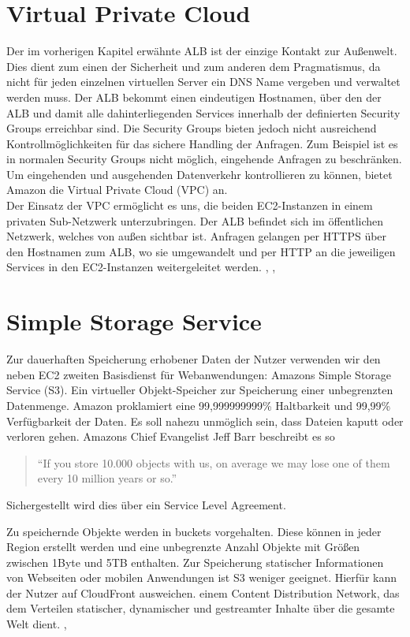 \section{Virtual Private Cloud}
\label{sec:vpc}
Der im vorherigen Kapitel erwähnte ALB ist der einzige Kontakt zur Außenwelt. Dies dient zum einen der Sicherheit und zum anderen dem Pragmatismus, da nicht für jeden einzelnen virtuellen Server ein DNS Name vergeben und verwaltet werden muss. Der ALB bekommt einen eindeutigen Hostnamen, über den der ALB und damit alle dahinterliegenden Services innerhalb der definierten Security Groups erreichbar sind. Die Security Groups bieten jedoch nicht ausreichend Kontrollmöglichkeiten für das sichere Handling der Anfragen. Zum Beispiel ist es in normalen Security Groups nicht möglich, eingehende Anfragen zu beschränken. Um eingehenden und ausgehenden Datenverkehr kontrollieren zu können, bietet Amazon die Virtual Private Cloud (VPC) an. \\
Der Einsatz der VPC ermöglicht es uns, die beiden EC2-Instanzen in einem privaten Sub-Netzwerk unterzubringen. Der ALB befindet sich im öffentlichen Netzwerk, welches von außen sichtbar ist. Anfragen gelangen per HTTPS über den Hostnamen zum ALB, wo sie umgewandelt und per HTTP an die jeweiligen Services in den EC2-Instanzen weitergeleitet werden.
\cite{vliet:resilience}, \cite{wittig:awsinaction}, \cite{aws:vpc}

\section{Simple Storage Service}
\label{sec:s3}
Zur dauerhaften Speicherung erhobener Daten der Nutzer verwenden wir den neben EC2 zweiten Basisdienst für Webanwendungen: Amazons Simple Storage Service (S3). Ein virtueller Objekt-Speicher zur Speicherung einer unbegrenzten Datenmenge. Amazon proklamiert eine 99,999999999\% Haltbarkeit und 99,99\% Verfügbarkeit der Daten. Es soll nahezu unmöglich sein, dass Dateien kaputt oder verloren gehen. Amazons Chief Evangelist Jeff Barr beschreibt es so \\
\begin{quote}
"`If you store 10.000 objects with us, on average we may lose one of them every 10 million years or so."'
\end{quote} \cite{vliet:programmingec2}

Sichergestellt wird dies über ein Service Level Agreement. \cite{vliet:programmingec2}

Zu speichernde Objekte werden in buckets vorgehalten. Diese können in jeder Region erstellt werden und eine unbegrenzte Anzahl Objekte mit Größen zwischen 1Byte und 5TB enthalten. Zur Speicherung statischer Informationen von Webseiten oder mobilen Anwendungen ist S3 weniger geeignet. Hierfür kann der Nutzer auf CloudFront ausweichen. einem Content Distribution Network, das dem Verteilen statischer, dynamischer und gestreamter Inhalte über die gesamte Welt dient.
\cite{vliet:resilience}, \cite{aws:s3}

